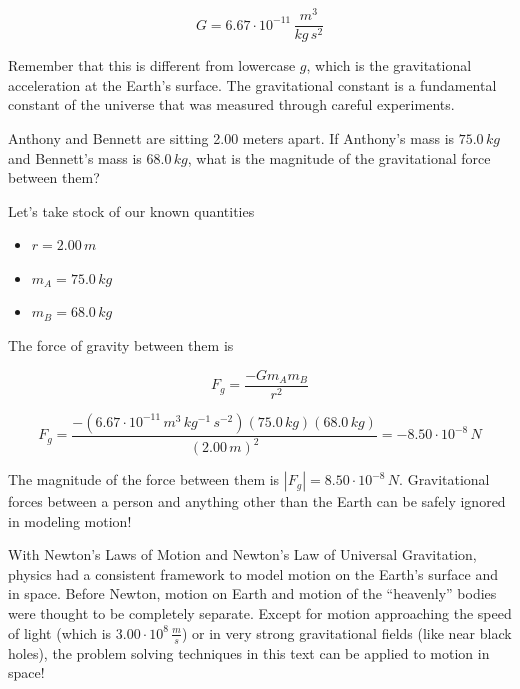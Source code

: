 \documentclass[12pt]{book}
\begin{document}
\begin{equation}
G = 6.67 \cdot 10^{-11} \, \frac{m^3}{kg \, s^2}
\end{equation}

Remember that this is different from lowercase $g$, which is the gravitational acceleration at the Earth's surface. The gravitational constant is a fundamental constant of the universe that was measured through careful experiments.

\begin{exampleblock}

Anthony and Bennett are sitting 2.00 meters apart. If Anthony's mass is $75.0 \, kg$ and Bennett's mass is $68.0 \, kg$, what is the magnitude of the gravitational force between them?

\hspace{10pt}

Let's take stock of our known quantities

\begin{itemize}
\item $r = 2.00 \, m$
\item $m_A = 75.0 \, kg$
\item $m_B = 68.0 \, kg$
\end{itemize}

The force of gravity between them is

\begin{equation}
F_g = \frac{-G m_A m_B}{r^2}
\end{equation}

\begin{equation}
F_g = \frac{-(6.67 \cdot 10^{-11} \, m^3 \, kg^{-1} \, s^{-2}) (75.0 \, kg) (68.0 \, kg)}{(2.00 \, m)^2} = -8.50 \cdot 10^{-8} \, N
\end{equation}

The magnitude of the force between them is $|F_g| = 8.50 \cdot 10^{-8} \, N$. Gravitational forces between a person and anything other than the Earth can be safely ignored in modeling motion!
\end{exampleblock}

With Newton's Laws of Motion and Newton's Law of Universal Gravitation, physics had a consistent framework to model motion on the Earth's surface and in space. Before Newton, motion on Earth and motion of the ``heavenly'' bodies were thought to be completely separate. Except for motion approaching the speed of light (which is $3.00 \cdot 10^8 \, \frac{m}{s}$) or in very strong gravitational fields (like near black holes), the problem solving techniques in this text can be applied to motion in space!
\end{document}
